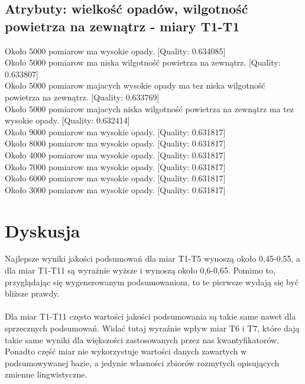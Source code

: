 \documentclass{classrep}
\begin{document}
\subsection{Atrybuty: wielkość opadów, wilgotność powietrza na zewnątrz - miary T1-T1}
Około 5000 pomiarow ma wysokie opady. [Quality: 0.634085]\\
Około 5000 pomiarow ma niska wilgotność powietrza na zewnątrz. [Quality: 0.633807]\\
Około 5000 pomiarow majacych wysokie opady ma tez niska wilgotność powietrza na zewnątrz. [Quality: 0.633769]\\
Około 5000 pomiarow majacych niska wilgotność powietrza na zewnątrz ma tez wysokie opady. [Quality: 0.632414]\\
Około 9000 pomiarow ma wysokie opady. [Quality: 0.631817]\\
Około 8000 pomiarow ma wysokie opady. [Quality: 0.631817]\\
Około 4000 pomiarow ma wysokie opady. [Quality: 0.631817]\\
Około 7000 pomiarow ma wysokie opady. [Quality: 0.631817]\\
Około 6000 pomiarow ma wysokie opady. [Quality: 0.631817]\\
Około 3000 pomiarow ma wysokie opady. [Quality: 0.631817]\\

\section{Dyskusja}
Najlepsze wyniki jakości podsumowań dla miar T1-T5 wynoszą około 0,45-0,55, a dla miar T1-T11 są wyraźnie wyższe i wynoszą około 0,6-0,65. Pomimo to, przyglądając się wygenerowanym podsumowaniom, to te pierwsze wydają się być bliższe prawdy.

\paragraph{}
Dla miar T1-T11 często wartości jakości podsumowania są takie same nawet dla sprzecznych podsumowań. Widać tutaj wyraźnie wpływ miar T6 i T7, które dają takie same wyniki dla większości zastosowanych przez nas kwantyfikatorów. Ponadto część miar nie wykorzystuje wartości danych zawartych w podsumowywanej bazie, a jedynie własności zbiorów rozmytych opisujących zmienne lingwistyczne.
\end{document}
